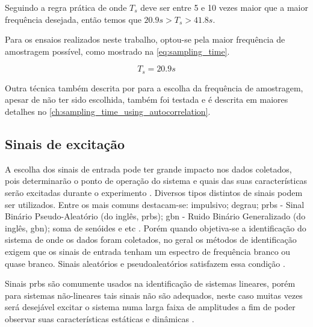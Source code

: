 Seguindo a regra prática de  onde $T_s$ deve ser entre 5 e 10 vezes maior que a
maior frequência desejada, então temos que $20.9s > T_s > 41.8s$.

Para os ensaios realizados neste trabalho, optou-se pela maior frequência de amostragem possível, como
mostrado na \cref{eq:sampling_time}.

\begin{equation}
	\label{eq:sampling_time}
	T_s = 20.9s
\end{equation}

Outra técnica também descrita por  para a escolha da frequência de amostragem,
apesar de não ter sido escolhida, também foi testada e é descrita em maiores detalhes no
\cref{ch:sampling_time_using_autocorrelation}.

\subsection{Sinais de excitação}
\label{subsec:sinais_de_excitacao}

A escolha dos sinais de entrada pode ter grande impacto nos dados coletados,
pois determinarão o ponto de operação do sistema e quais das suas características serão excitadas
durante o experimento \cite{Aguirre2015}.
Diversos tipos distintos de sinais podem ser utilizados. Entre os mais comuns destacam-se:
impulsivo; degrau; \acrshort{prbs} - Sinal Binário Pseudo-Aleatório (do inglês, \acrlong{prbs});
\acrshort{gbn} - Ruido Binário Generalizado (do inglês, \acrlong{gbn}); soma de senóides e etc \cite{Aguirre2015}.
Porém quando objetiva-se a identificação do sistema de onde os dados foram coletados, no geral
os métodos de identificação exigem que os sinais de entrada tenham um espectro de frequência
branco ou quase branco. Sinais aleatórios e pseudoaleatórios satisfazem essa condição \cite{Aguirre2015}.

Sinais \acrshort{prbs} são comumente usados na identificação de sistemas lineares, porém para sistemas
não-lineares tais sinais não são adequados, neste caso muitas vezes será desejável excitar o
sistema numa larga faixa de amplitudes a fim de poder observar suas características estáticas e dinâmicas
\cite{Aguirre2015}.

